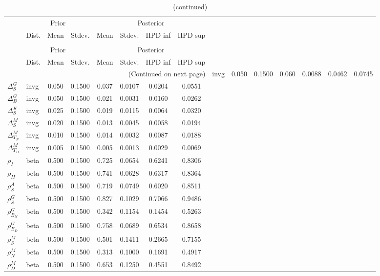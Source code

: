  
\begin{center}
\begin{longtable}{llcccccc} 
\caption{Results from Metropolis-Hastings (parameters)}
 \label{Table:MHPosterior:1}\\
\toprule 
  & \multicolumn{3}{c}{Prior}  &  \multicolumn{4}{c}{Posterior} \\
  \cmidrule(r{.75em}){2-4} \cmidrule(r{.75em}){5-8}
  & Dist. & Mean  & Stdev. & Mean & Stdev. & HPD inf & HPD sup\\
\midrule \endfirsthead 
\caption{(continued)}\\\toprule 
  & \multicolumn{3}{c}{Prior}  &  \multicolumn{4}{c}{Posterior} \\
  \cmidrule(r{.75em}){2-4} \cmidrule(r{.75em}){5-8}
  & Dist. & Mean  & Stdev. & Mean & Stdev. & HPD inf & HPD sup\\
\midrule \endhead 
\bottomrule \multicolumn{8}{r}{(Continued on next page)} \endfoot 
\bottomrule \endlastfoot 
${\Delta^{A}_{S}}$ & invg &   0.050 & 0.1500 &   0.060& 0.0088 &  0.0462 &  0.0745 \\ 
${\Delta^{G}_{S}}$ & invg &   0.050 & 0.1500 &   0.037& 0.0107 &  0.0204 &  0.0551 \\ 
${\Delta^{G}_{B}}$ & invg &   0.050 & 0.1500 &   0.021& 0.0031 &  0.0160 &  0.0262 \\ 
${\Delta^{K}_{S}}$ & invg &   0.025 & 0.1500 &   0.019& 0.0115 &  0.0064 &  0.0320 \\ 
${\Delta^{M}_{S}}$ & invg &   0.020 & 0.1500 &   0.013& 0.0045 &  0.0058 &  0.0194 \\ 
${\Delta^{M}_{T_N}}$ & invg &   0.010 & 0.1500 &   0.014& 0.0032 &  0.0087 &  0.0188 \\ 
${\Delta^{M}_{T_D}}$ & invg &   0.005 & 0.1500 &   0.005& 0.0013 &  0.0029 &  0.0069 \\ 
${\rho_{I}}$ & beta &   0.500 & 0.1500 &   0.725& 0.0654 &  0.6241 &  0.8306 \\ 
${\rho_{II}}$ & beta &   0.500 & 0.1500 &   0.741& 0.0628 &  0.6317 &  0.8364 \\ 
${\rho^{A}_{S}}$ & beta &   0.500 & 0.1500 &   0.719& 0.0749 &  0.6020 &  0.8511 \\ 
${\rho^{G}_{S}}$ & beta &   0.500 & 0.1500 &   0.827& 0.1029 &  0.7066 &  0.9486 \\ 
${\rho^{G}_{B_N}}$ & beta &   0.500 & 0.1500 &   0.342& 0.1154 &  0.1454 &  0.5263 \\ 
${\rho^{G}_{B_D}}$ & beta &   0.500 & 0.1500 &   0.758& 0.0689 &  0.6534 &  0.8658 \\ 
${\rho^{M}_{S}}$ & beta &   0.500 & 0.1500 &   0.501& 0.1411 &  0.2665 &  0.7155 \\ 
${\rho^{M}_{N}}$ & beta &   0.500 & 0.1500 &   0.313& 0.1000 &  0.1691 &  0.4917 \\ 
${\rho^{M}_{D}}$ & beta &   0.500 & 0.1500 &   0.653& 0.1250 &  0.4551 &  0.8492 \\ 
\end{longtable}
 \end{center}
